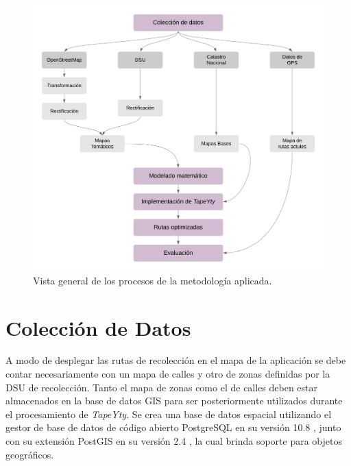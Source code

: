 \begin{figure}[htbp]
\centerline{\includegraphics[width=\textwidth]{DiagramaDeMetodologia.png}}
\caption{Vista general de los procesos de la metodología aplicada.}
\label{fig:metodologia}
\end{figure}


\section{Colección de Datos}

A modo de desplegar las rutas de recolección en el mapa de la aplicación se debe contar necesariamente con un mapa de calles y otro de zonas definidas por la DSU de recolección. Tanto el mapa de zonas como el de calles deben estar almacenados en la base de datos GIS para ser posteriormente utilizados durante el procesamiento de \textit{TapeYty}. Se crea una base de datos espacial utilizando el gestor de base de datos de código abierto PostgreSQL en su versión 10.8 \citep{PostgreSQL}, junto con su extensión PostGIS en su versión 2.4 \citep{PostGIS}, la cual brinda soporte para objetos geográficos.

